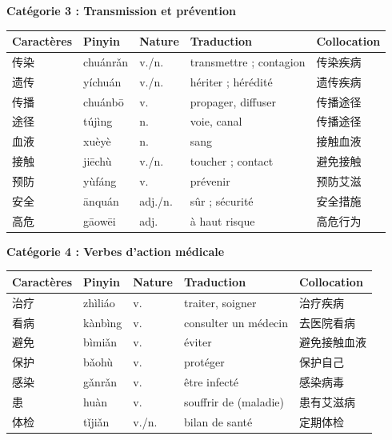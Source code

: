\documentclass[11pt]{article}
\begin{document}
\textbf{Catégorie 3 : Transmission et prévention}\par

\begin{center}
\begin{tabularx}{\linewidth}{|X|X|X|X|X|}
\hline
\rowcolor{popblueL} Caractères & Pinyin & Nature & Traduction & Collocation \\
\hline
传染 & chuánrǎn & v./n. & transmettre ; contagion & 传染疾病 \\
\hline
遗传 & yíchuán & v./n. & hériter ; hérédité & 遗传疾病 \\
\hline
传播 & chuánbō & v. & propager, diffuser & 传播途径 \\
\hline
途径 & tújìng & n. & voie, canal & 传播途径 \\
\hline
血液 & xuèyè & n. & sang & 接触血液 \\
\hline
接触 & jiēchù & v./n. & toucher ; contact & 避免接触 \\
\hline
预防 & yùfáng & v. & prévenir & 预防艾滋 \\
\hline
安全 & ānquán & adj./n. & sûr ; sécurité & 安全措施 \\
\hline
高危 & gāowēi & adj. & à haut risque & 高危行为 \\
\hline
\end{tabularx}
\end{center}

\textbf{Catégorie 4 : Verbes d'action médicale}\par

\begin{center}
\begin{tabularx}{\linewidth}{|X|X|X|X|X|}
\hline
\rowcolor{popblueL} Caractères & Pinyin & Nature & Traduction & Collocation \\
\hline
治疗 & zhìliáo & v. & traiter, soigner & 治疗疾病 \\
\hline
看病 & kànbìng & v. & consulter un médecin & 去医院看病 \\
\hline
避免 & bìmiǎn & v. & éviter & 避免接触血液 \\
\hline
保护 & bǎohù & v. & protéger & 保护自己 \\
\hline
感染 & gǎnrǎn & v. & être infecté & 感染病毒 \\
\hline
患 & huàn & v. & souffrir de (maladie) & 患有艾滋病 \\
\hline
体检 & tǐjiǎn & v./n. & bilan de santé & 定期体检 \\
\hline
\end{tabularx}
\end{center}
\end{document}
